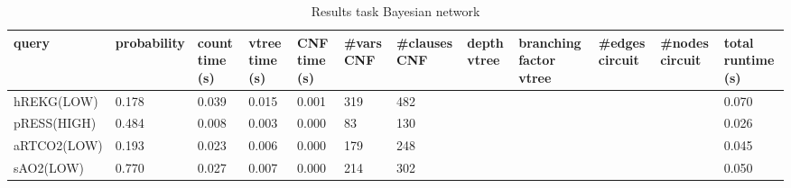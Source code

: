 \begin{table}[h]
\centering
\caption{Results task Bayesian network}
\label{table:results-bayesian}
\begin{tabular}{l|l|l|l|l|l|l|l|l|l|l|l}
\textbf{query} & \textbf{probability} & \textbf{count time (s)} & \textbf{vtree time (s)} & \textbf{CNF time (s)} & \textbf{\#vars CNF} & \textbf{\#clauses CNF} & \textbf{depth vtree} & \textbf{branching factor vtree} & \textbf{\#edges circuit} & \textbf{\#nodes circuit} & \textbf{total runtime (s)} \\ \hline
hREKG(LOW) & 0.178  &  0.039  & 0.015  & 0.001  & 319 & 482      &   &   &    &     & 0.070  \\
pRESS(HIGH) &  0.484  &  0.008  & 0.003 & 0.000  & 83 & 130  &  &   &       &    &   0.026 \\
aRTCO2(LOW) &  0.193 &  0.023 & 0.006 & 0.000  & 179 & 248 &  &  &  &  & 0.045  \\
sAO2(LOW) & 0.770  & 0.027 & 0.007 & 0.000 & 214 & 302 &   &  &  &  &  0.050
\end{tabular}
\end{table}

